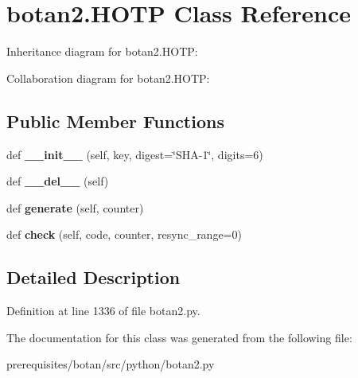 \hypertarget{classbotan2_1_1_h_o_t_p}{}\section{botan2.\+H\+O\+TP Class Reference}
\label{classbotan2_1_1_h_o_t_p}


Inheritance diagram for botan2.\+H\+O\+TP\+:


Collaboration diagram for botan2.\+H\+O\+TP\+:
\subsection*{Public Member Functions}
\begin{DoxyCompactItemize}
\item 
\mbox{\label{classbotan2_1_1_h_o_t_p_a604802e17c0579f39100e62a62fd7263}} 
def {\bfseries \+\_\+\+\_\+init\+\_\+\+\_\+} (self, key, digest=\char`\"{}S\+HA-\/1\char`\"{}, digits=6)
\item 
\mbox{\label{classbotan2_1_1_h_o_t_p_a05f735a31aa2457ce432407ced9bcff6}} 
def {\bfseries \+\_\+\+\_\+del\+\_\+\+\_\+} (self)
\item 
\mbox{\label{classbotan2_1_1_h_o_t_p_ad6fc715f951abf031db9ff417ddca991}} 
def {\bfseries generate} (self, counter)
\item 
\mbox{\label{classbotan2_1_1_h_o_t_p_a9c8844680cf964c6e6a8e408545b1824}} 
def {\bfseries check} (self, code, counter, resync\+\_\+range=0)
\end{DoxyCompactItemize}


\subsection{Detailed Description}


Definition at line 1336 of file botan2.\+py.



The documentation for this class was generated from the following file\+:\begin{DoxyCompactItemize}
\item 
prerequisites/botan/src/python/botan2.\+py\end{DoxyCompactItemize}
